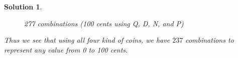 \documentclass{article}
\newtheorem*{solution*}{Solution}
\begin{document}
\begin{solution*}
\begin{figure}[htbp]

\caption{277 combinations (100 cents using Q, D, N, and P)}
\label{fig:sideways_tree} %
\end{figure}

Thus we see that using all four kind of coins,
we have $237$ combinations to represent any value 
from 0 to 100 cents.

\end{solution*}
\end{document}
